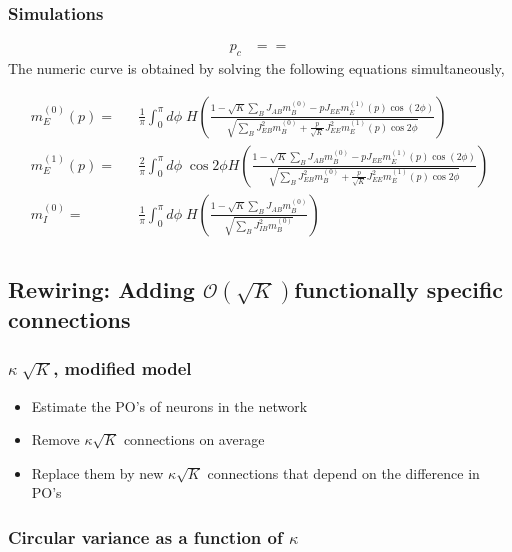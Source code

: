 \documentclass[%
 reprint,
 amsmath,amssymb,
 aps,
]{revtex4-1}
\begin{document}
\subsubsection{Simulations}
\newcommand{\mEOne}{m_E^{(1)}}
\newcommand{\mEZero}{m_E^{(0)}}
\newcommand{\mIZero}{m_I^{(0)}}
\begin{align}
p_c &== 
\end{align}
The numeric curve is obtained by solving the following equations simultaneously,
\begin{widetext}
\begin{eqnarray}
\label{me0Sol}
m_E^{(0)}(p) =&& \frac{1}{\pi} \int_0^\pi d\phi \;  H\left( \frac{1 - \sqrt{K} \sum_B J_{AB} m_B^{(0)} - p J_{EE} \mEOne(p) \cos(2 \phi) }{\sqrt{\sum_B J_{EB}^2 m_B^{(0)} + \frac{p}{\sqrt{K}} J^2_{EE} \mEOne(p) \cos2\phi} } \right)\\
\label{me1Sol}
\mEOne(p) =&& \frac{2}{\pi} \int_0^\pi d\phi \; \cos 2\phi H\left( \frac{1 - \sqrt{K} \sum_B J_{AB} m_B^{(0)} - p J_{EE} \mEOne(p)  \cos(2 \phi)}{\sqrt{\sum_B J_{EB}^2 m_B^{(0)} + \frac{p}{\sqrt{K}} J^2_{EE} \mEOne(p) \cos2\phi} } \right)  \\
\label{mi0Sol}
m_I^{(0)} =&& \frac{1}{\pi} \int_0^\pi d\phi \;  H\left( \frac{1 - \sqrt{K} \sum_B J_{AB} m_B^{(0)} }{\sqrt{\sum_B J_{IB}^2 m_B^{(0)}}} \right) \\
\end{eqnarray}
\end{widetext}

\subsection{Rewiring: Adding $\mathcal{O} (\sqrt{K})$functionally specific connections}

\subsubsection{$\kappa \; \sqrt{K}$, modified model}
\begin{itemize}
    \item Estimate the PO's of neurons in the network
	\item Remove $\kappa \sqrt{K}$ connections on average
	\item Replace them by new $\kappa \sqrt{K}$ connections that depend on the difference in PO's
\end{itemize}

\subsubsection{Circular variance as a function of $\kappa$} 
\end{document}
